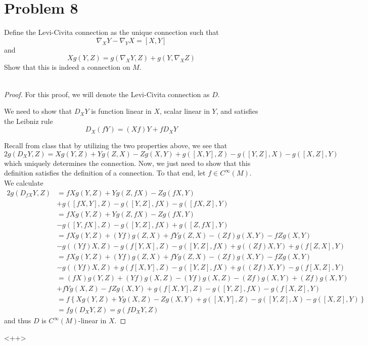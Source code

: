 \documentclass[fontsize=11pt]{scrartcl} %
\numberwithin{equation}{section} %
\numberwithin{figure}{section} %
\numberwithin{table}{section} %
\begin{document}
\section*{Problem 8}
Define the Levi-Civita connection as the unique connection such that
\[
    \nabla_X Y-\nabla_YX = [X,Y]
\]
and
\[
    Xg(Y,Z) = g(\nabla_XY,Z) + g(Y,\nabla_XZ)
\]
Show that this is indeed a connection on $M$.
\\
\\
\begin{proof}
    For this proof, we will denote the Levi-Civita connection as $D$.

    We need to show that $D_XY$ is function linear in $X$, scalar linear in
    $Y$, and satisfies the Leibniz rule
    \[
        D_X(fY) = (Xf)Y + fD_XY
    \]

    Recall from class that by utilizing the two properties above, we see that
    \[
        2g(D_XY,Z) = Xg(Y,Z) + Yg(Z,X) - Zg(X,Y) + g([X,Y],Z) -g([Y,Z],X) -
        g([X,Z],Y)
    \]
    which uniquely determines the connection. Now, we just need to show that
    this definition satisfies the definition of a connection. To that end, let
    $f\in C^{\infty}(M)$. We calculate
    \[
\begin{aligned}
    2g(D_{fX}Y,Z) &= fXg(Y,Z) + Yg(Z,fX) - Zg(fX,Y)\\
        &+ g([fX,Y],Z) -g([Y,Z],fX) - g([fX,Z],Y)\\
        &=fXg(Y,Z) + Yg(Z,fX) - Zg(fX,Y)\\
        &- g([Y,fX],Z) - g([Y,Z],fX) + g([Z,fX],Y)\\
        &=fXg(Y,Z) + (Yf)g(Z,X) + fYg(Z,X) - (Zf)g(X,Y) - fZg(X,Y)\\
        &- g((Yf)X,Z) - g(f[Y,X],Z) - g([Y,Z],fX) + g((Zf)X,Y) + g(f[Z,X],Y)\\
        &=fXg(Y,Z)  + (Yf)g(Z,X) + fYg(Z,X) - (Zf)g(X,Y) - fZg(X,Y)\\
        &- g((Yf)X,Z) + g(f[X,Y],Z) - g([Y,Z],fX) + g((Zf)X,Y) - g(f[X,Z],Y)\\
        &=(fX)g(Y,Z) + (Yf)g(X,Z) - (Yf)g(X,Z) - (Zf)g(X,Y) + (Zf)g(X,Y)\\
        &+ fYg(X,Z) -fZg(X,Y) + g(f[X,Y],Z) -g([Y,Z],fX) -g(f[X,Z],Y)\\
        &= f\left\{ Xg(Y,Z) + Yg(X,Z) -Zg(X,Y) + g([X,Y],Z) - g([Y,Z],X) -
        g([X,Z],Y) \right\}\\
        &=fg(D_XY,Z) = g(fD_XY,Z)
\end{aligned}
    \]
    and thus $D$ is $C^{\infty}(M)$-linear in $X$.
\end{proof}<++>
\end{document}
